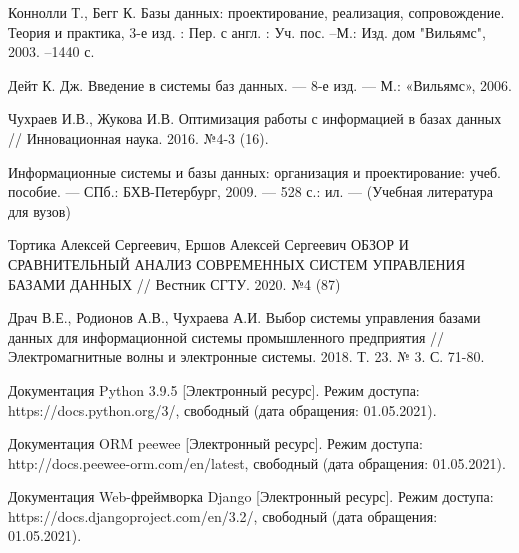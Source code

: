 \documentclass[10pt,a4paper]{report}
\begin{document}
	\makeatletter %
	\def\@biblabel#1{#1. }
	\makeatother
	\begin{thebibliography}{9}
		 Коннолли Т., Бегг К. Базы данных: проектирование, реализация, сопровождение. Теория и практика, 3-е изд. : Пер. с англ. : Уч. пос. –М.: Изд. дом "Вильямс", 2003. –1440 с.
		
		 Дейт К. Дж. Введение в системы баз данных. — 8-е изд. — М.:
		«Вильямс», 2006.
		
		 Чухраев И.В., Жукова И.В. Оптимизация работы с информацией в базах данных // Инновационная наука. 2016. №4-3 (16).
		
		 Информационные системы и базы данных: организация и проектирование: учеб. пособие. — СПб.: БХВ-Петербург, 2009. — 528 с.: ил. — (Учебная литература для вузов)
				
		 Тортика Алексей Сергеевич, Ершов Алексей Сергеевич ОБЗОР И СРАВНИТЕЛЬНЫЙ АНАЛИЗ СОВРЕМЕННЫХ СИСТЕМ УПРАВЛЕНИЯ БАЗАМИ ДАННЫХ // Вестник СГТУ. 2020. №4 (87)
		
		 Драч В.Е., Родионов А.В., Чухраева А.И. Выбор системы управления базами данных для информационной системы промышленного предприятия // Электромагнитные волны и электронные системы. 2018. Т. 23. № 3. С. 71-80.
		
		 Документация Python 3.9.5 [Электронный ресурс]. Режим доступа: https://docs.python.org/3/, свободный (дата обращения: 01.05.2021).
		
		 Документация ORM peewee [Электронный ресурс]. Режим доступа:
		 http://docs.peewee-orm.com/en/latest, свободный (дата обращения: 01.05.2021).
		 
 		 Документация Web-фреймворка Django [Электронный ресурс]. Режим доступа: https://docs.djangoproject.com/en/3.2/, свободный (дата обращения: 01.05.2021).
	\end{thebibliography}
\end{document}
